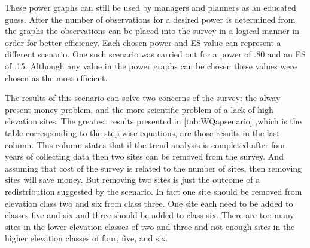 These power graphs can still be used by managers and planners as an educated guess.
After the number of observations for a desired power is determined from the graphs the observations can be placed into the survey in a logical manner in order for better efficiency.
Each chosen power and ES value can represent a different scenario.
One such scenario was carried out for a power of .80 and an ES of .15.
Although any value in the power graphs can be chosen these values were chosen as the most efficient. 

The results of this scenario can solve two concerns of the survey: the alway present money problem, and the more scientific problem of a lack of high elevation sites.
The greatest results presented in \autoref{tab:WQapsenario} ,which is the table corresponding to the step-wise equations, are those results in the last column.
This column states that if the trend analysis is completed after four years of collecting data then two sites can be removed from the survey.
And assuming that cost of the survey is related to the number of sites, then removing sites will save money.
But removing two sites is just the outcome of a redistribution suggested by the scenario.
In fact one site should be removed from elevation class two and six from class three.
One site each need to be added to classes five and six and three should be added to class six.
There are too many sites in the lower elevation classes of two and three and not enough sites in the higher elevation classes of four, five, and six.

